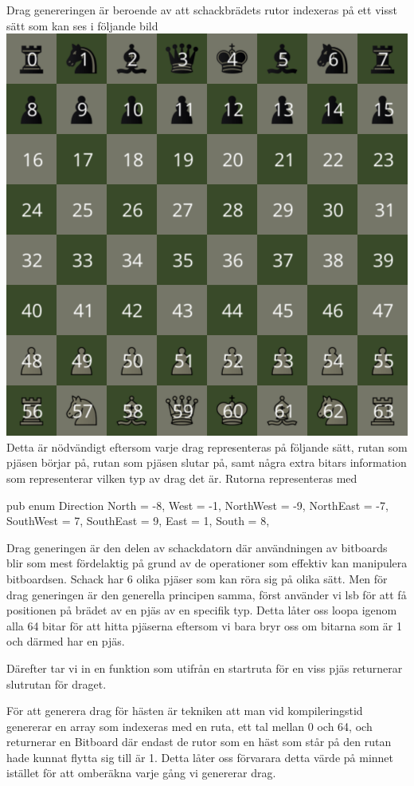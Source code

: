 \documentclass{article}
\begin{document}
Drag genereringen är beroende av att schackbrädets rutor indexeras på ett visst sätt som kan ses i följande bild
\includegraphics[scale=0.1]{board_indexed}
Detta är nödvändigt eftersom varje drag representeras på följande sätt, rutan som pjäsen börjar på, rutan som pjäsen slutar på, samt några extra bitars information som representerar vilken typ av drag det är. Rutorna representeras med

pub enum Direction {
    North = -8,
    West = -1,
    NorthWest = -9,
    NorthEast = -7,
    SouthWest = 7,
    SouthEast = 9,
    East = 1,
    South = 8,
}

Drag generingen är den delen av schackdatorn där användningen av bitboards blir som mest fördelaktig på grund av de operationer som effektiv kan manipulera bitboardsen. Schack har 6 olika pjäser som kan röra sig på olika sätt. Men för drag generingen är den generella principen samma, först använder vi lsb för att få positionen på brädet av en pjäs av en specifik typ. Detta låter oss loopa igenom alla 64 bitar för att hitta pjäserna eftersom vi bara bryr oss om bitarna som är 1 och därmed har en pjäs. 


Därefter tar vi in en funktion som utifrån en startruta för en viss pjäs returnerar slutrutan för draget. 

För att generera drag för hästen är tekniken att man vid kompileringstid genererar en array som indexeras med en ruta, ett tal mellan 0 och 64, och returnerar en Bitboard där endast de rutor som en häst som står på den rutan hade kunnat flytta sig till är 1. Detta låter oss förvarara detta värde på minnet istället för att omberäkna varje gång vi genererar drag. 
\end{document}
